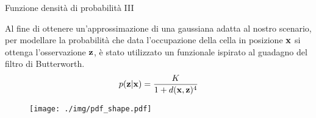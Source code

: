 \documentclass[aspectratio=169, leqno]{beamer}
\begin{document}
	\begin{frame}{Funzione densità di probabilità III}

	Al fine di ottenere un'approssimazione di una gaussiana adatta al
	nostro scenario, per modellare la probabilità che data l'occupazione della
	cella in posizione $ {\bf x} $ si ottenga l'osservazione $ {\bf z} $, è
	stato utilizzato un funzionale ispirato al guadagno del filtro di
	Butterworth.
	\begin{equation}\label{eq:pdf}
	p({\bf z}|{\bf x}) = \frac	{K}
	{1 + d({\bf x},{\bf z})^4 } 
	\end{equation}
	
	\begin{figure}[ht]
		\centering
		\texttt{[image: ./img/pdf\_shape.pdf]}
		\label{fig:pdf_shape}
	\end{figure}
	
	
	\end{frame}
\end{document}
